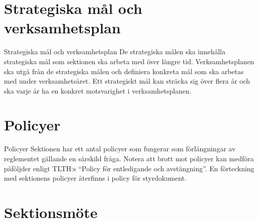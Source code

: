 \documentclass[pdfbookmarks,a4paper,11pt]{article}
\newlength{\itemcollength}
\newenvironment{reglemlista}{%
  \begin{list}{}{%
      \setlength{\labelwidth}{\itemcollength}%
      \setlength{\leftmargin}{\labelwidth + \labelsep}%
      \renewcommand{\makelabel}[1]{%
        \raisebox{0pt}[1ex][0pt]{%
          \makebox[\labelwidth][l]{%
            \parbox[t]{\itemcollength}{%
              \raggedright\hspace{0pt}##1}}}\hfill}%
      }}{%
  \end{list}}
\begin{document}
\section{Strategiska mål och verksamhetsplan}

\begin{reglemlista}

	\item[Strategiska mål och verksamhetsplan]
	De strategiska målen ska innehålla strategiska mål som sektionen ska arbeta med
över längre tid. Verksamhetsplanen ska utgå från de strategiska målen och definiera konkreta mål som ska arbetas med under verksamhetsåret. Ett strategiskt mål
kan sträcka sig över flera år och ska varje år ha en konkret motsvarighet i verksamhetsplanen.

\end{reglemlista}

\section{Policyer}

\begin{reglemlista}
	\item[Policyer]
    Sektionen har ett antal policyer som fungerar som förlängningar av reglementet gällande en särskild fråga. Notera att brott mot policyer kan medföra påföljder enligt TLTH:s “Policy för entledigande och avstängning”. En förteckning med sektionens policyer återfinns i policy för styrdokument.
\end{reglemlista}


\section{Sektionsmöte}
\end{document}
